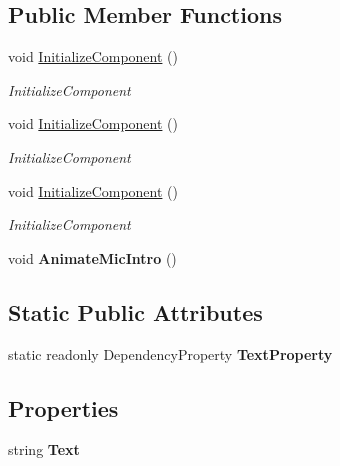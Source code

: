 \subsection*{Public Member Functions}
\begin{DoxyCompactItemize}
\item 
void \hyperlink{class_microsoft_1_1_samples_1_1_kinect_1_1_basic_interactions_1_1_voice_instruction_control_aaffa454993ff63ac2197c87c61eb57da}{Initialize\-Component} ()
\begin{DoxyCompactList}\small\item\em Initialize\-Component \end{DoxyCompactList}\item 
void \hyperlink{class_microsoft_1_1_samples_1_1_kinect_1_1_basic_interactions_1_1_voice_instruction_control_aaffa454993ff63ac2197c87c61eb57da}{Initialize\-Component} ()
\begin{DoxyCompactList}\small\item\em Initialize\-Component \end{DoxyCompactList}\item 
void \hyperlink{class_microsoft_1_1_samples_1_1_kinect_1_1_basic_interactions_1_1_voice_instruction_control_aaffa454993ff63ac2197c87c61eb57da}{Initialize\-Component} ()
\begin{DoxyCompactList}\small\item\em Initialize\-Component \end{DoxyCompactList}\item 
\hypertarget{class_microsoft_1_1_samples_1_1_kinect_1_1_basic_interactions_1_1_voice_instruction_control_a58b8903873df2805c69a88e794db92c2}{void {\bfseries Animate\-Mic\-Intro} ()}\label{class_microsoft_1_1_samples_1_1_kinect_1_1_basic_interactions_1_1_voice_instruction_control_a58b8903873df2805c69a88e794db92c2}

\end{DoxyCompactItemize}
\subsection*{Static Public Attributes}
\begin{DoxyCompactItemize}
\item 
static readonly Dependency\-Property {\bfseries Text\-Property}
\end{DoxyCompactItemize}
\subsection*{Properties}
\begin{DoxyCompactItemize}
\item 
\hypertarget{class_microsoft_1_1_samples_1_1_kinect_1_1_basic_interactions_1_1_voice_instruction_control_a835ed81e9aa35cbc8bd20b8c106b6a25}{string {\bfseries Text}}\label{class_microsoft_1_1_samples_1_1_kinect_1_1_basic_interactions_1_1_voice_instruction_control_a835ed81e9aa35cbc8bd20b8c106b6a25}

\end{DoxyCompactItemize}


